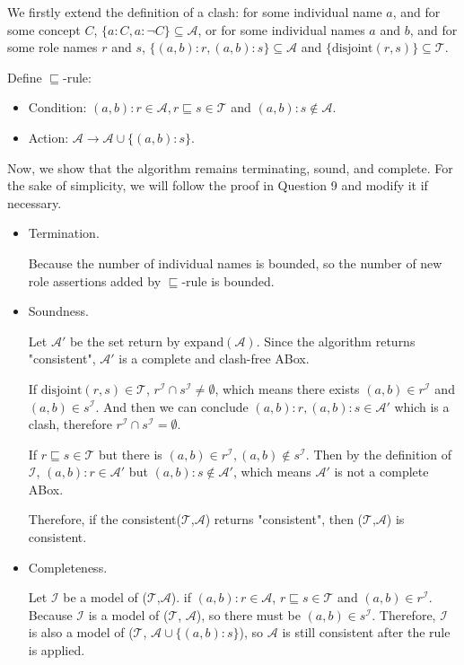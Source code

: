 \documentclass[12pt]{article}
\begin{document}
    We firstly extend the definition of a clash: for some individual name $a$, and for some concept $C$, $\{ a: C, a: \lnot C \} \subseteq \mathcal{A}$, or for some individual names $a$ and $b$, and for some role names $r$ and $s$, $\{ (a, b): r, (a, b): s \} \subseteq \mathcal{A}$ and $\{ \text{disjoint}(r, s) \} \subseteq \mathcal{T}$.\par
    Define $\sqsubseteq$-rule: \par
    \begin{itemize}
        \item Condition: $(a, b): r\in \mathcal{A}, r\sqsubseteq s\in\mathcal{T} $ and $(a, b): s \not \in \mathcal{A}$.\par
        \item Action: $\mathcal{A} \rightarrow \mathcal{A} \cup \{ (a, b): s \}$. \par
    \end{itemize}
    Now, we show that the algorithm remains terminating, sound, and complete. For the sake of simplicity, we will follow the proof in Question 9 and modify it if necessary.\par
    \begin{itemize}
        \item Termination. \par
        Because the number of individual names is bounded, so the number of new role assertions added by $\sqsubseteq$-rule is bounded. \par
        \item Soundness. \par
        Let $\mathcal{A}'$ be the set return by $\text{expand}(\mathcal{A})$. Since the algorithm returns "consistent", $\mathcal{A}'$ is a complete and clash-free ABox. \par
        If $\text{disjoint}(r,s)\in \mathcal{T}$, $r^{\mathcal{I}} \cap s^{\mathcal{I}} \neq \emptyset$, which means there exists $(a,b)\in r^\mathcal{I}$ and $(a,b)\in s^\mathcal{I}$. And then we can conclude $(a,b):r, (a,b):s\in \mathcal{A}'$ which is a clash, therefore $r^\mathcal{I}\cap s^\mathcal{I} = \emptyset$. \par
        If $r\sqsubseteq s\in \mathcal{T}$ but there is $(a,b)\in r^\mathcal{I}, (a,b)\not\in s^\mathcal{I}$. Then by the definition of $\mathcal{I}$, $(a, b): r \in \mathcal{A}'$ but $(a, b): s \not \in \mathcal{A}'$, which means $\mathcal{A}'$ is not a complete ABox. \par
        Therefore, if the consistent($\mathcal{T}$,$\mathcal{A}$) returns "consistent", then ($\mathcal{T}$,$\mathcal{A}$) is consistent.\par
        \item Completeness. \par
        Let $\mathcal{I}$ be a model of ($\mathcal{T}$,$\mathcal{A}$). if $(a,b):r\in\mathcal{A}$, $r\sqsubseteq s\in \mathcal{T}$ and $(a,b)\in r^\mathcal{I}$. Because $\mathcal{I}$ is a model of ($\mathcal{T}$, $\mathcal{A}$), so there must be $(a,b)\in s^\mathcal{I}$. Therefore, $\mathcal{I}$ is also a model of ($\mathcal{T}$, $\mathcal{A} \cup \{(a,b):s\}$), so $\mathcal{A}$ is still consistent after the rule is applied.\par
    \end{itemize}
\end{document}
